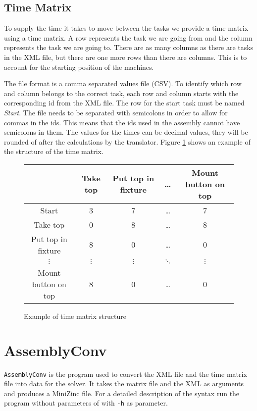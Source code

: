 \subsection{Time Matrix}
To supply the time it takes to move between the tasks we provide a time matrix using a time matrix. A row represents the task we are going from and the column represents the task we are going to. There are as many columns as there are tasks in the XML file, but there are one more rows than there are columns. This is to account for the starting position of the machines.

The file format is a comma separated values file (CSV). To identify which row and column belongs to the correct task, each row and column starts with the corresponding id from the XML file. The row for the start task must be named \emph{Start}. The file needs to be separated with semicolons in order to allow for commas in the ids. This means that the ids used in the assembly cannot have semicolons in them. The values for the times can be decimal values, they will be rounded of after the calculations by the translator. Figure \ref{fig:time_matrix} shows an example of the structure of the time matrix.

\begin{figure}[h]
\begin{tabular}{c|c|c|c|c}
& Take top & Put top in fixture & \dots & Mount button on top\\\hline
Start & 3 & 7 & \dots & 7\\\hline
Take top & 0 & 8 & \dots & 8\\\hline
Put top in fixture & 8 & 0 & \dots & 0\\\hline
$\vdots$ & $\vdots$ & $\vdots$ & $\ddots$ & $\vdots$\\\hline
Mount button on top & 8 & 0 & \dots & 0
\end{tabular}
\caption{Example of time matrix structure}
\label{fig:time_matrix}
\end{figure}

\section{AssemblyConv}
\texttt{AssemblyConv} is the program used to convert the XML file and the time matrix file into data for the solver. It takes the matrix file and the XML as arguments and produces a MiniZinc file. For a detailed description of the syntax run the program without parameters of with \texttt{-h} as parameter.

